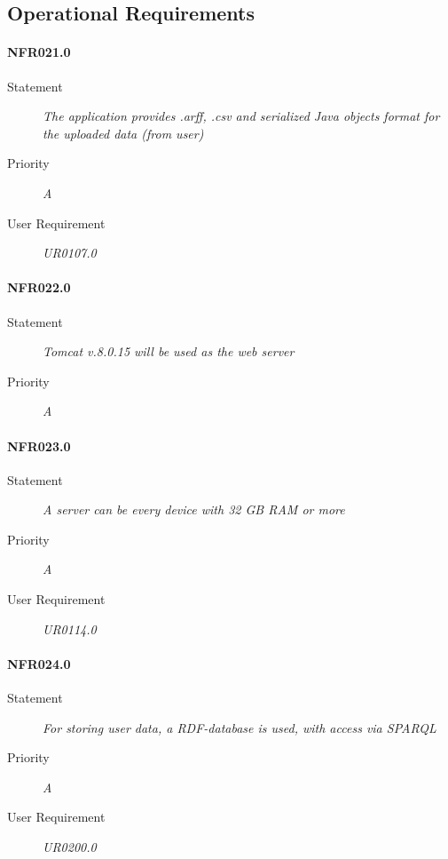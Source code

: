 \subsection{Operational Requirements}

\paragraph{NFR021.0}
\begin{description}
\item [Statement] \textit{
The application provides .\gls{arff}, .\gls{csv} and serialized Java objects format for the uploaded data (from user)
}
\item [Priority] \textit{A}
\item[User Requirement] \textit{UR0107.0}
\end{description}

\paragraph{NFR022.0}
\begin{description}
\item [Statement] \textit{
\gls{Tomcat} v.8.0.15 will be used as the web server
}
\item [Priority] \textit{A}
\end{description}

\paragraph{NFR023.0}
\begin{description}
\item [Statement] \textit{
A server can be every device with 32 GB RAM or more 
}
\item [Priority] \textit{A}
\item[User Requirement] \textit{UR0114.0}
\end{description}

\paragraph{NFR024.0}
\begin{description}
\item [Statement] \textit{
For storing user data, a \gls{RDF}-database is used, with access via \gls{SPARQL}
}
\item [Priority] \textit{A}
\item[User Requirement] \textit{UR0200.0}
\end{description}